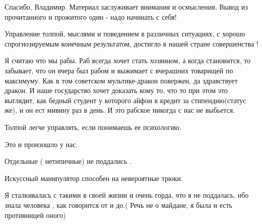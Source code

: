 \begin{itemize}
\begin{itemize}
\end{itemize}

 
Спасибо, Владимир. Материал заслуживает внимания и осмысления. Вывод из прочитанного и прожитого один - надо начинать с себя!

 
Управление толпой, мыслями и поведением в различных ситуациях, с хорошо
спрогнозируемым конечным результатом, достигло в нашей стране совершенства !

 

Я считаю что мы рабы. Раб всегда хочет стать хозяином, а когда становится, то
забывает, что он вчера был рабом и выжимает с вчерашних товарищей по максимуму.
Как в том советском мультике-дракон повержен, да здравствует дракон. И наше
государство хочет доказать кому то, что то при этом это выглядит, как бедный
студент у которого айфон в кредит за стипендию(статус же), и он ест мивину раз
в день. И это рабское никогда с нас не выбьется.

 
Толпой легче управлять, если понимаешь ее психологию.

Это и произошло у нас.

Отдельные ( нетипичные) не поддались .

Искуссный манипулятор способен на невероятные трюки.

Я сталкивалась с такими в своей жизни и очень горда, что я не поддалась, ибо
знала человека , как говорится от и до.( Речь не о майдане, я была и есть
противницей оного)


\end{itemize}

